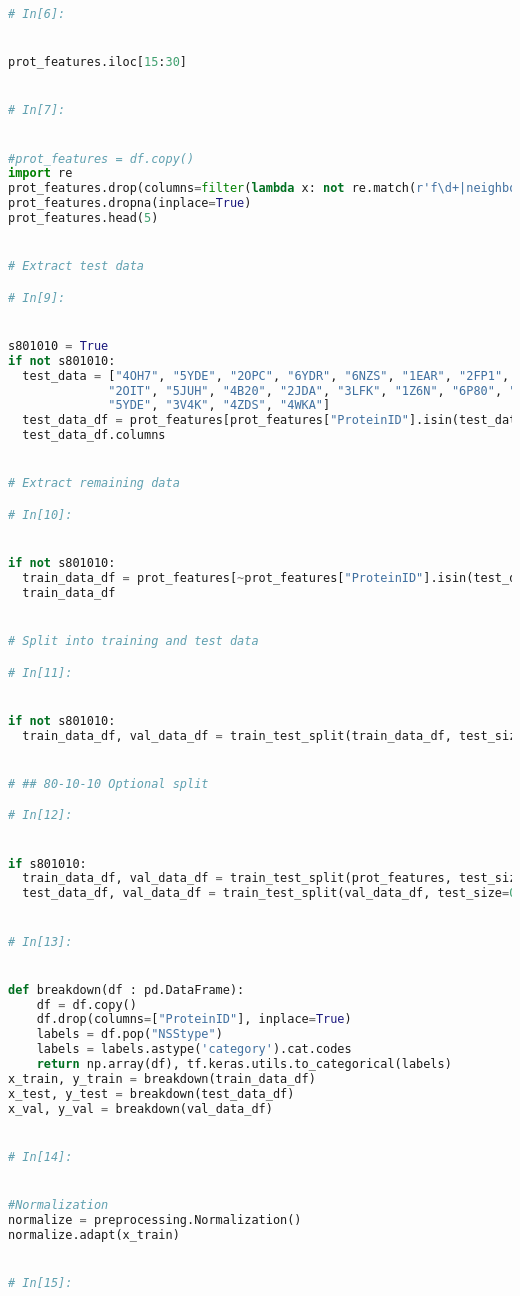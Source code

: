 \documentclass[12pt,letterpaper,oneside,reqno]{book}
\theoremstyle{plain}
\theoremstyle{definition}
\theoremstyle{plain}
\theoremstyle{remark}
\theoremstyle{plain}
\theoremstyle{definition}
\theoremstyle{plain}
\begin{document}
\begin{appendices}
\begin{lstlisting}[language=Python, label=lst:7classfcnnfull, frame=single]
# In[6]:


prot_features.iloc[15:30]


# In[7]:


#prot_features = df.copy()
import re
prot_features.drop(columns=filter(lambda x: not re.match(r'f\d+|neighbors|ProteinID|NSStype', x) ,prot_features.columns), inplace=True)
prot_features.dropna(inplace=True)
prot_features.head(5)


# Extract test data

# In[9]:


s801010 = True
if not s801010:
  test_data = ["4OH7", "5YDE", "2OPC", "6YDR", "6NZS", "1EAR", "2FP1", "2Z6R",
              "2OIT", "5JUH", "4B20", "2JDA", "3LFK", "1Z6N", "6P80", "5UEB",
              "5YDE", "3V4K", "4ZDS", "4WKA"]
  test_data_df = prot_features[prot_features["ProteinID"].isin(test_data)]
  test_data_df.columns


# Extract remaining data

# In[10]:


if not s801010:
  train_data_df = prot_features[~prot_features["ProteinID"].isin(test_data)]
  train_data_df


# Split into training and test data

# In[11]:


if not s801010:
  train_data_df, val_data_df = train_test_split(train_data_df, test_size=0.1)


# ## 80-10-10 Optional split

# In[12]:


if s801010:
  train_data_df, val_data_df = train_test_split(prot_features, test_size=0.2)
  test_data_df, val_data_df = train_test_split(val_data_df, test_size=0.5)


# In[13]:


def breakdown(df : pd.DataFrame):
    df = df.copy()
    df.drop(columns=["ProteinID"], inplace=True)
    labels = df.pop("NSStype")
    labels = labels.astype('category').cat.codes
    return np.array(df), tf.keras.utils.to_categorical(labels)
x_train, y_train = breakdown(train_data_df)
x_test, y_test = breakdown(test_data_df)
x_val, y_val = breakdown(val_data_df)


# In[14]:


#Normalization
normalize = preprocessing.Normalization()
normalize.adapt(x_train)


# In[15]:



\end{lstlisting}
\end{appendices}
\end{document}

